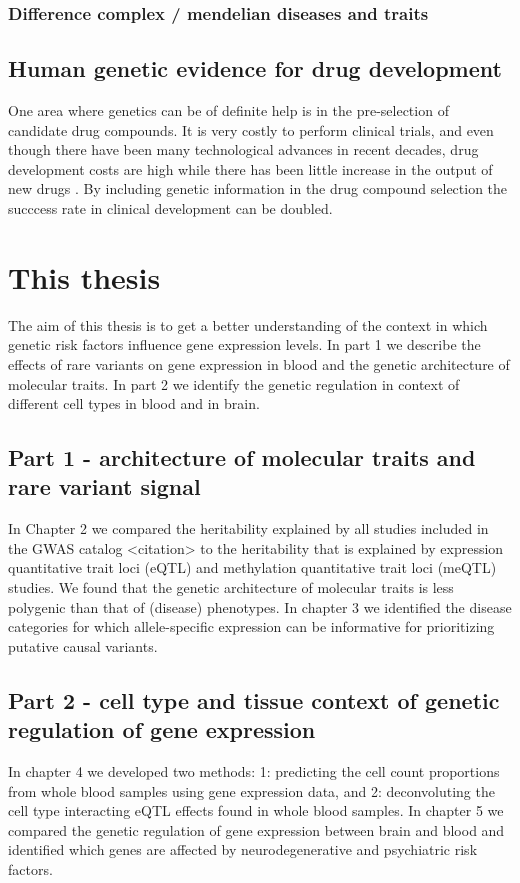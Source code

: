 \subsubsection{Difference complex / mendelian diseases and traits}

\subsection{Human genetic evidence for drug development}
One area where genetics can be of definite help is in the pre-selection of candidate drug compounds. It is very costly to perform clinical trials, and even though there have been many technological advances in recent decades, drug development costs are high while there has been little increase in the output of new drugs \cite{cookLessonsLearnedFate2014a}. By including genetic information in the drug compound selection the succcess rate in clinical development can be doubled\cite{nelsonSupportHumanGenetic2015b}. 

\section{This thesis}
The aim of this thesis is to get a better understanding of the context in which genetic risk factors influence gene expression levels. In part 1 we describe the effects of rare variants on gene expression in blood and the genetic architecture of molecular traits. In part 2 we identify the genetic regulation in context of different cell types in blood and in brain.

\subsection{Part 1 - architecture of molecular traits and rare variant signal}
In Chapter 2 we compared the heritability explained by all studies included in the GWAS catalog <citation> to the heritability that is explained by expression quantitative trait loci (eQTL) and methylation quantitative trait loci (meQTL) studies. We found that the genetic architecture of molecular traits is less polygenic than that of (disease) phenotypes. In chapter 3 we identified the disease categories for which allele-specific expression can be informative for prioritizing putative causal variants.

\subsection{Part 2 - cell type and tissue context of genetic regulation of gene expression}
In chapter 4 we developed two methods: 1: predicting the cell count proportions from whole blood samples using gene expression data, and 2: deconvoluting the cell type interacting eQTL effects found in whole blood samples. In chapter 5 we compared the genetic regulation of gene expression between brain and blood and identified which genes are affected by neurodegenerative and psychiatric risk factors.



